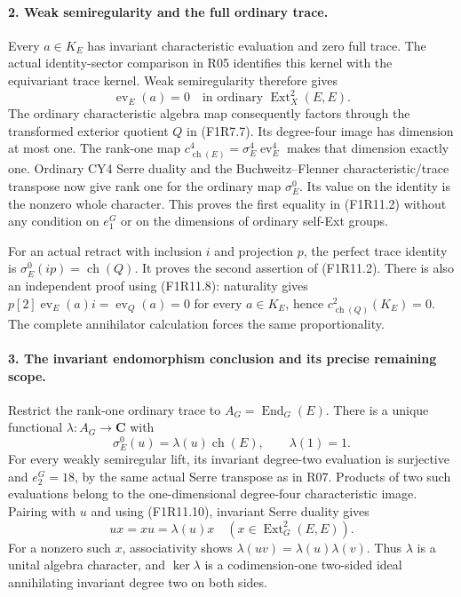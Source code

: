 \paragraph{2. Weak semiregularity and the full ordinary trace.}
Every $a\in K_E$ has invariant characteristic evaluation and
zero full trace. The actual identity-sector comparison in R05
identifies this kernel with the equivariant trace kernel.
Weak semiregularity therefore gives
\[
                  \operatorname{ev}_E(a)=0
                  \quad\text{in ordinary }\operatorname{Ext}^2_X(E,E).
 \tag{F1R11.9}
\]
The ordinary characteristic algebra map consequently factors
through the transformed exterior quotient $Q$ in (F1R7.7).
Its degree-four image has dimension at most one. The
rank-one map $c^4_{\operatorname{ch}(E)}
=\sigma_E^4\operatorname{ev}_E^4$ makes that dimension
exactly one. Ordinary CY4 Serre duality and the
Buchweitz--Flenner characteristic/trace transpose now give
rank one for the ordinary map $\sigma_E^0$. Its value on
the identity is the nonzero whole character. This proves
the first equality in (F1R11.2) without any condition on
$e_1^G$ or on the dimensions of ordinary self-Ext groups.

For an actual retract with inclusion $i$ and projection $p$,
the perfect trace identity is
$\sigma_E^0(ip)=\operatorname{ch}(Q)$. It proves the
second assertion of (F1R11.2). There is also an independent
proof using (F1R11.8): naturality gives
$p[2]\operatorname{ev}_E(a)i=\operatorname{ev}_Q(a)=0$
for every $a\in K_E$, hence
$c^2_{\operatorname{ch}(Q)}(K_E)=0$. The complete
annihilator calculation forces the same proportionality.

\paragraph{3. The invariant endomorphism conclusion and its precise remaining scope.}
Restrict the rank-one ordinary trace to
$A_G=\operatorname{End}_G(E)$. There is a unique functional
$\lambda:A_G\to\mathbf C$ with
\[
 \sigma_E^0(u)=\lambda(u)\operatorname{ch}(E),\qquad
                         \lambda(1)=1.
 \tag{F1R11.10}
\]
For every weakly semiregular lift, its invariant degree-two
evaluation is surjective and $e_2^G=18$, by the same actual
Serre transpose as in R07. Products of two such evaluations
belong to the one-dimensional degree-four characteristic
image. Pairing with $u$ and using (F1R11.10), invariant
Serre duality gives
\[
 ux=xu=\lambda(u)x
             \quad(x\in\operatorname{Ext}^2_G(E,E)).
 \tag{F1R11.11}
\]
For a nonzero such $x$, associativity shows
$\lambda(uv)=\lambda(u)\lambda(v)$. Thus $\lambda$ is a
unital algebra character, and $\ker\lambda$ is a
codimension-one two-sided ideal annihilating invariant
degree two on both sides.


